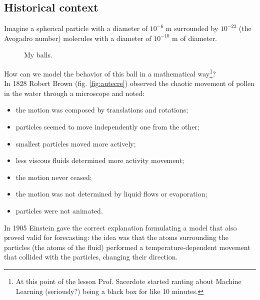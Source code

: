 \documentclass[12pt]{report}
\begin{document}
\subsection{Historical context}
Imagine a spherical particle with a diameter of $10^{-6}$ m surrounded by $10^{-23}$ (the Avogadro number) molecules with a diameter of $10^{-10}$ m of diameter.
\begin{figure}[h]
	\centering
	\caption{My balls.}
	\label{fig:screenshot006}
\end{figure}
How can we model the behavior of this ball in a mathematical way\footnote{At this point of the lesson Prof. Sacerdote started ranting about Machine Learning (seriously?) being a black box for like 10 minutes.}?\\
In 1828 Robert Brown (fig. \ref{fig:autecre}) observed the chaotic movement of pollen in the water through a microscope and noted:
\begin{itemize}
	\item the motion was composed by translations and rotations;
	\item particles seemed to move independently one from the other;
	\item smallest particles moved more actively;
	\item less viscous fluids determined more activity movement;
	\item the motion never ceased;
	\item the motion was not determined by liquid flows or evaporation;
	\item particles were not animated.
\end{itemize}
In 1905 Einstein gave the correct explanation formulating a model that also proved valid for forecasting: the idea was that the atoms surrounding the particles (the atoms of the fluid) performed a temperature-dependent movement that collided with the particles, changing their direction.\\
\end{document}

